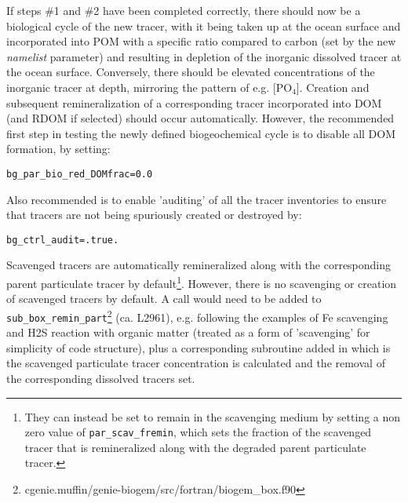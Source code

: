 \documentclass[10pt,twoside]{article}
\begin{document}
If steps \#1 and \#2 have been completed correctly, there should now be a biological cycle of the new tracer, with it being taken up at the ocean surface and incorporated into POM with a specific ratio compared to carbon (set by the new \textit{namelist} parameter) and resulting in depletion of the inorganic dissolved tracer at the ocean surface. Conversely, there should be elevated concentrations of the inorganic tracer at depth, mirroring the pattern of e.g. [PO\(_{4}\)].
Creation and subsequent remineralization of a corresponding tracer incorporated into DOM (and RDOM if selected) should occur automatically. However, the recommended first step in testing the newly defined biogeochemical cycle
is to disable all DOM formation, by setting:
\vspace{-5pt}\begin{verbatim}
bg_par_bio_red_DOMfrac=0.0
\end{verbatim}\vspace{-5pt}
Also recommended is to enable 'auditing' of all the tracer inventories to ensure that tracers are not being spuriously created or destroyed by:
\vspace{-5pt}\begin{verbatim}
bg_ctrl_audit=.true.
\end{verbatim}\vspace{-5pt}
Scavenged tracers are  automatically  remineralized along with the corresponding parent particulate tracer by default\footnote{They can instead be set to remain in the scavenging medium by setting a non zero value of \texttt{par\_scav\_fremin}, which sets the fraction of the scavenged tracer that is remineralized along with the degraded parent particulate tracer.}.
However, there is no scavenging or creation of scavenged tracers by default. A call would need to be added to \texttt{sub\_box\_remin\_part}\footnote{cgenie.muffin/genie-biogem/src/fortran/biogem\_box.f90} (ca. L2961), e.g. following the examples of Fe scavenging and H2S reaction with organic matter (treated as a form of 'scavenging' for simplicity of code structure), plus a corresponding subroutine added in which is the scavenged particulate tracer concentration is calculated and the removal of the corresponding dissolved tracers set. 

\end{document}
